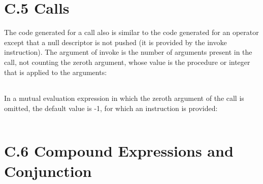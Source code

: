 \section[C.5 Calls]{C.5 Calls}

The code generated for a call also is similar to the code generated
for an operator except that a null descriptor is not pushed (it is
provided by the invoke instruction). The argument of invoke is the
number of arguments present in the call, not counting the zeroth
argument, whose value is the procedure or integer that is applied to
the arguments:

\begin{center}
\tablelasttail{\hline}
\begin{xtabular}{|m{1.9073598in}|m{2.75596in}|}

\end{xtabular}
\end{center}

In a mutual evaluation expression in which the zeroth argument of the
{\textquotedbl}call{\textquotedbl} is omitted, the default value is
-1, for which an instruction is provided:

\begin{center}
\tablelasttail{\hline}
\begin{xtabular}{|m{1.9073598in}|m{2.75596in}|}

\end{xtabular}
\end{center}


\section[C.6 Compound Expressions and Conjunction]{C.6 Compound Expressions and Conjunction}


